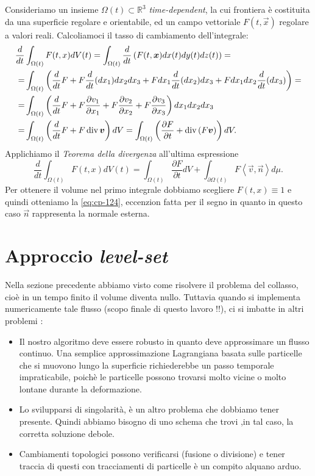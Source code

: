 \begin{osservazione}
\label{oss:cp-122}
Consideriamo un insieme $\Omega(t)\subset\mathbb{R}^3$ \emph{time-dependent}, la cui frontiera è costituita da una superficie regolare e orientabile, ed un campo vettoriale $F(t,\vec{x})$ regolare a valori reali. Calcoliamoci il tasso di cambiamento dell'integrale:
\[
\begin{aligned}
\frac{d}{dt}&\int_{\Omega(t)}F(t,x)dV(t) = \int_{\Omega(t)}\frac{d}{dt}\left(F(t,\bm{x})dx(t)dy(t)dz(t)\right)=\\
 =&\int_{\Omega(t)}\left(\frac{d}{dt}F + F\frac{d}{dt}(dx_1)dx_2dx_3 + Fdx_1\frac{d}{dt}(dx_2)dx_3 + Fdx_1dx_2\frac{d}{dt}(dx_3)\right)=\\
=&\int_{\Omega(t)}\left(\frac{d}{dt}F + F\frac{\partial v_1}{\partial x_1}+ F\frac{\partial v_2}{\partial x_2} + F\frac{\partial v_3}{\partial x_3}\right)dx_1dx_2dx_3\\
=& \int_{\Omega(t)}\left(\frac{d}{dt}F + F\operatorname{div}{\bm{v}}\right)dV = \int_{\Omega(t)}\left(\frac{\partial F}{\partial t} + \operatorname{div}{(F\bm{v})}\right)dV.
\end{aligned}
\]
Applichiamo il \emph{Teorema della divergenza} all'ultima espressione
\[
\frac{d}{dt}\int_{\Omega(t)}F(t,x)dV(t)=\int_{\Omega(t)}\frac{\partial F}{\partial t}dV + \int_{\partial \Omega(t)}F\left<\vec{v},\vec{n}\right>d\mu.
\]
Per ottenere il volume nel primo integrale dobbiamo scegliere $F(t,x)\equiv 1$ e quindi otteniamo la \eqref{eq:cp-124}, eccenzion fatta per il segno in quanto in questo caso $\vec{n}$ rappresenta la normale esterna.
\end{osservazione}
%
%
%
%
\section{Approccio \emph{level-set}}  

Nella sezione precedente abbiamo visto come risolvere il problema del collasso, cioè in un tempo finito il volume diventa nullo. Tuttavia quando si implementa numericamente tale flusso (scopo finale di questo lavoro !!), ci si imbatte in altri problemi :
\begin{itemize}

  \item Il nostro algoritmo deve essere robusto in quanto deve approssimare un flusso continuo. Una semplice approssimazione Lagrangiana basata sulle particelle che si muovono lungo la superficie richiederebbe un passo temporale impraticabile, poichè le particelle possono trovarsi molto vicine o molto lontane durante la deformazione.

   \item Lo svilupparsi di singolarità, è un altro problema che dobbiamo tener presente. Quindi abbiamo bisogno di uno schema che trovi ,in tal caso, la corretta soluzione debole.
   
   \item Cambiamenti topologici possono verificarsi (fusione o divisione) e tener traccia di questi con tracciamenti di particelle è un compito alquano arduo.

\end{itemize}

